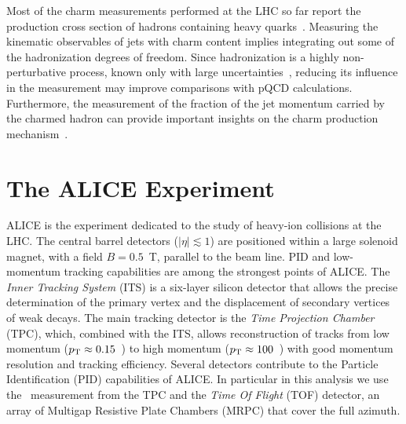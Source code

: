 \documentclass[a4paper]{jpconf}
\begin{document}
Most of the charm measurements performed at the LHC so far report the production cross section of hadrons
containing heavy quarks~\cite{ALICE:2012d, LHCb:2013a, ATLAS:2016a, ALICE:2016b}.
Measuring the kinematic observables of jets with charm content implies integrating out some of the hadronization degrees of freedom. 
Since hadronization is a highly non-perturbative process, known only with large uncertainties~\cite{dEnterria:2014}, 
reducing its influence in the measurement may improve comparisons with pQCD calculations.
Furthermore, 
the measurement of the fraction of the jet momentum carried 
by the charmed hadron can provide important insights on the charm production mechanism~\cite{CDF:1990, UA1:1990, STAR:2009a, ATLAS:2012d}.

\section{The ALICE Experiment}
ALICE is the experiment dedicated to the study of heavy-ion collisions at the LHC.
The central barrel detectors ($\lvert \eta\rvert \lesssim 1$) are positioned within a large solenoid magnet, with a
field $B = 0.5$~T, parallel to the beam line.
PID and low-momentum tracking capabilities are among the strongest points of ALICE.
The \emph{Inner Tracking System} (ITS) is a six-layer silicon detector that allows the precise determination of the primary vertex 
and the displacement of secondary vertices of weak decays.
The main tracking detector is the \emph{Time Projection Chamber} (TPC), which, combined with the ITS, allows reconstruction of tracks 
from low momentum ($p_{\rm T}\approx0.15$~\GeVc) to high momentum
($p_{\rm T}\approx100$~\GeVc) with good momentum resolution and tracking efficiency.
Several detectors contribute to the Particle Identification (PID) capabilities of ALICE. 
In particular in this analysis we use the \dedx\ measurement from the TPC and
the \emph{Time Of Flight} (TOF) detector,
an array of Multigap Resistive Plate Chambers (MRPC) that cover the full azimuth.
\end{document}
